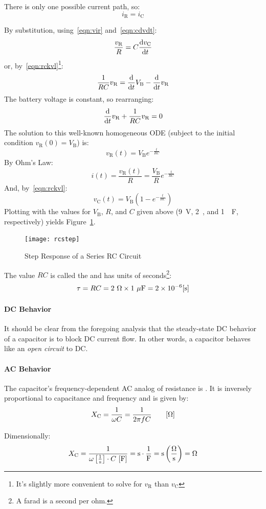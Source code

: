\documentclass[11pt]{article}
\newcommand*\gVdc{9~\unit{V}\xspace}
\newcommand*\gR{2~\unit{\Omega}\xspace}
\newcommand*\gC{1~\unit{\mu F}\xspace}
\begin{document}
There is only one possible current path, so:
\[
i_\mathrm{R} = i_\mathrm{C}
\]

By substitution, using~\eqref{eqn:vir} and~\eqref{eqn:cdvdt}:
\[
\frac{v_\mathrm{R}}{R} = C\deedee{v_\mathrm{C}}{t}
\]
or, by~\eqref{eqn:rckvl}\footnote{It's slightly more convenient to
  solve for $v_\mathrm{R}$ than $v_\mathrm{C}$}:
\[
\frac{1}{RC} v_\mathrm{R} = \deedee{t} V_\mathrm{B} - \deedee{t} v_\mathrm{R}
\]
The battery voltage is constant, so rearranging:
\[
\deedee{t} v_\mathrm{R} + \frac{1}{RC} v_\mathrm{R} = 0
\]
The solution to this well-known homogeneous ODE (subject to the
initial condition $v_\mathrm{R}(0)=V_\mathrm{B}$) is:
\[
v_\mathrm{R}(t) = V_\mathrm{B} e^{-\frac{t}{RC}}
\]
By Ohm's Law:
\[
i(t) = \frac{v_\mathrm{R}(t)}{R} = \frac{V_\mathrm{B}}{R} e^{-\frac{t}{RC}}
\]
And, by~\eqref{eqn:rckvl}:
\[
v_\mathrm{C}(t) = V_\mathrm{B}\left(1 - e^{-\frac{t}{RC}}\right)
\]
Plotting with the values for $V_\mathrm{B}$, $R$, and $C$ given above
(\gVdc, \gR, and \gC, respectively) yields Figure~\ref{fig:rcstep}.

\begin{figure}[ht]
  \centering
  \texttt{[image: rcstep]}
  \caption{Step Response of a Series RC Circuit}
  \label{fig:rcstep}
\end{figure}

The value $RC$ is called the  and has units of
seconds\footnote{A farad is a second per ohm.}:
\[
\tau = RC = \gR\times\gC = 2\times 10^{-6}\bunit{s}
\]


\paragraph{DC Behavior}

It should be clear from the foregoing analysis that the steady-state
DC behavior of a capacitor is to block DC current flow. In other
words, a capacitor behaves like an \emph{open circuit} to DC.


\paragraph{AC Behavior}

The capacitor's frequency-dependent AC analog of resistance is
. It is inversely proportional to
capacitance and frequency and is given by:
\[
X_\mathrm{C} = \frac{1}{\omega C} = \frac{1}{2\pi f C} \qquad\bunit{\Omega}
\]

Dimensionally:
\[
X_\mathrm{C} = \frac{1}{\omega\bunit{1}{s}\cdot C~\bunit{F}} = \unit{s}\cdot\unit{1}{F} = \unit{s}\left(\unit{\Omega}{s}\right) = \unit{\Omega}
\]
\end{document}
